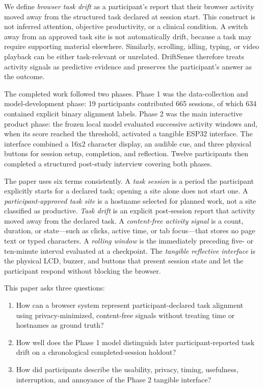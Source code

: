 \documentclass[12pt,a4paper]{article}
\begin{document}
We define \emph{browser task drift} as a participant's report that their browser activity moved away from the structured task declared at session start. This construct is not inferred attention, objective productivity, or a clinical condition. A switch away from an approved task site is not automatically drift, because a task may require supporting material elsewhere. Similarly, scrolling, idling, typing, or video playback can be either task-relevant or unrelated. DriftSense therefore treats activity signals as predictive evidence and preserves the participant's answer as the outcome.

The completed work followed two phases. Phase 1 was the data-collection and model-development phase: 19 participants contributed 665 sessions, of which 634 contained explicit binary alignment labels. Phase 2 was the main interactive product phase: the frozen local model evaluated successive activity windows and, when its score reached the threshold, activated a tangible ESP32 interface. The interface combined a 16x2 character display, an audible cue, and three physical buttons for session setup, completion, and reflection. Twelve participants then completed a structured post-study interview covering both phases.

The paper uses six terms consistently. A \emph{task session} is a period the participant explicitly starts for a declared task; opening a site alone does not start one. A \emph{participant-approved task site} is a hostname selected for planned work, not a site classified as productive. \emph{Task drift} is an explicit post-session report that activity moved away from the declared task. A \emph{content-free activity signal} is a count, duration, or state---such as clicks, active time, or tab focus---that stores no page text or typed characters. A \emph{rolling window} is the immediately preceding five- or ten-minute interval evaluated at a checkpoint. The \emph{tangible reflective interface} is the physical LCD, buzzer, and buttons that present session state and let the participant respond without blocking the browser.

This paper asks three questions:

\begin{enumerate}[label=\textit{RQ\arabic*:},font=\itshape]
\item How can a browser system represent participant-declared task alignment using privacy-minimized, content-free signals without treating time or hostnames as ground truth?
\item How well does the Phase 1 model distinguish later participant-reported task drift on a chronological completed-session holdout?
\item How did participants describe the usability, privacy, timing, usefulness, interruption, and annoyance of the Phase 2 tangible interface?
\end{enumerate}
\end{document}
